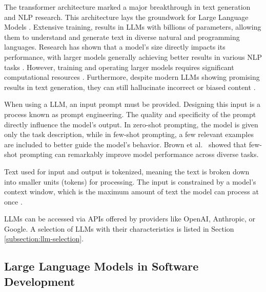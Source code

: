 The transformer architecture marked a major breakthrough in text generation and \ac{NLP} research.
This architecture lays the groundwork for Large Language Models \cite{changSurveyEvaluationLarge2024, naveedComprehensiveOverviewLarge2024}. Extensive training, results in \acp{LLM} with billions of parameters, allowing them to understand and generate text in diverse natural and programming languages. Research has shown that a model's size directly impacts its performance, with larger models generally achieving better results in various \ac{NLP} tasks \cite{kaplanScalingLawsNeural2020}. However, training and operating larger models requires significant computational resources \cite{LLMsWhatsLarge, naveedComprehensiveOverviewLarge2024}. Furthermore, despite modern \acp{LLM} showing promising results in text generation, they can still hallucinate incorrect or biased content \cite{LLMsWhatsLarge}.

When using a \ac{LLM}, an input prompt must be provided. Designing this input is a process known as prompt engineering. The quality and specificity of the prompt directly influence the model's output. In zero-shot prompting, the model is given only the task description, while in few-shot prompting, a few relevant examples are included to better guide the model's behavior. Brown et al.~\cite{brownLanguageModelsAre2020} showed that few-shot prompting can remarkably improve model performance across diverse tasks.

Text used for input and output is tokenized, meaning the text is broken down into smaller units (tokens) for processing. The input is constrained by a model's context window, which is the maximum amount of text the model can process at once \cite{naveedComprehensiveOverviewLarge2024}.

\acp{LLM} can be accessed via APIs offered by providers like OpenAI, Anthropic, or Google. A selection of \acp{LLM} with their characteristics is listed in Section \ref{subsection:llm-selection}.

\subsection{Large Language Models in Software Development}

